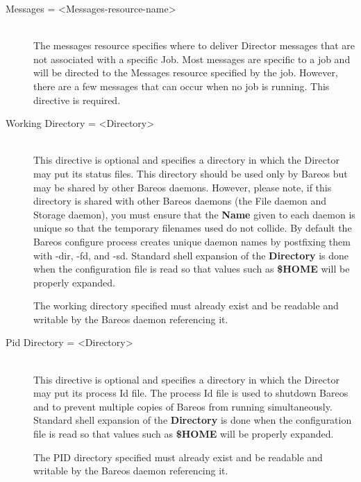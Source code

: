 \begin{description}
\item [Messages = {\textless}Messages-resource-name{\textgreater}] \hfill \\
The messages resource  specifies where to deliver Director messages that are
not associated  with a specific Job. Most messages are specific to a job and
will  be directed to the Messages resource specified by the job. However,
there are a few messages that can occur when no job is running.  This
directive is required.

\item [Working Directory = {\textless}Directory{\textgreater}] \hfill \\
This directive is optional and specifies a directory in which the Director
may put its status files. This directory should be used only  by Bareos but
may be shared by other Bareos daemons. However, please note, if this
directory is shared with other Bareos daemons (the File daemon and Storage
daemon), you must ensure that the {\bf Name} given to each daemon is
unique so that the temporary filenames used do not collide.
By default
the Bareos configure process creates unique daemon names by postfixing them
with -dir, -fd, and -sd.
Standard shell expansion of the {\bf
Directory}  is done when the configuration file is read so that values such
as {\bf \$HOME} will be properly expanded.

The working directory specified must already exist and be
readable and writable by the Bareos daemon referencing it.


\item [Pid Directory = {\textless}Directory{\textgreater}] \hfill \\
This directive  is optional and specifies a directory in which the Director
may put its process Id file. The process Id file is used to  shutdown
Bareos and to prevent multiple copies of  Bareos from running simultaneously.
Standard shell expansion of the {\bf Directory}  is done when the
configuration file is read so that values such  as {\bf \$HOME} will be
properly expanded.

The PID directory specified must already exist and be
readable and writable by the Bareos daemon referencing it.


\end{description}
